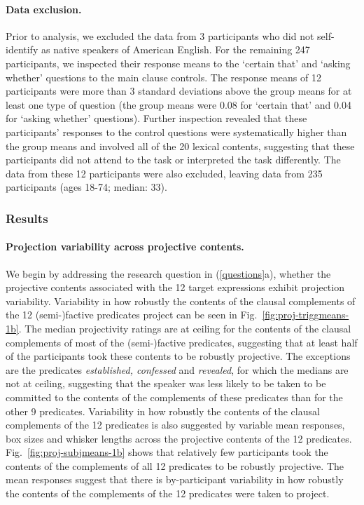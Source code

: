 \documentclass[11pt,fleqn]{article}
\newcommand{\6}{\mbox{$[\hspace*{-.6mm}[$}}
\newcommand{\9}{\mbox{$]\hspace*{-.6mm}]$}}
\newcommand{\figref}[1]{Fig.~\ref{#1}}
\begin{document}
\paragraph{Data exclusion.} Prior to analysis, we excluded the data from 3 participants who did not self-identify as native speakers of American English. For the remaining 247 participants, we inspected their response means to the `certain that' and `asking whether' questions to the main clause controls. The response means of 12 participants were more than 3 standard deviations above the group means for at least one type of question (the group means were 0.08 for `certain that' and 0.04 for `asking whether' questions). Further inspection revealed that these participants' responses to the control questions were systematically higher than the group means and involved all of the 20 lexical contents, suggesting that these participants did not attend to the task or interpreted the task differently. The data from these 12 participants were also excluded, leaving data from 235 participants (ages 18-74; median: 33).

\subsubsection{Results}

\paragraph{Projection variability across projective contents.} We begin by addressing the research question in (\ref{questions}a), whether the projective contents associated with the 12 target expressions exhibit projection variability. Variability in how robustly the contents of the clausal complements of the 12 (semi-)factive predicates project can be seen in \figref{fig:proj-triggmeans-1b}. The median projectivity ratings are at ceiling for the contents of the clausal complements of most of the (semi-)factive predicates, suggesting that at least half of the participants took these contents to be robustly projective. The exceptions are the predicates {\em established, confessed} and {\em revealed}, for which the medians are not at ceiling, suggesting that the speaker was less likely to be taken to be committed to the contents of the complements of these predicates than for the other 9 predicates. Variability in how robustly the contents of the clausal complements of the 12 predicates is also suggested by variable mean responses, box sizes and whisker lengths across the projective contents of the 12 predicates. \figref{fig:proj-subjmeans-1b} shows that relatively few participants took the contents of the complements of all 12 predicates to be robustly projective. The mean responses suggest that there is by-participant variability in how robustly the contents of the complements of the 12 predicates were taken to project.
\end{document}
